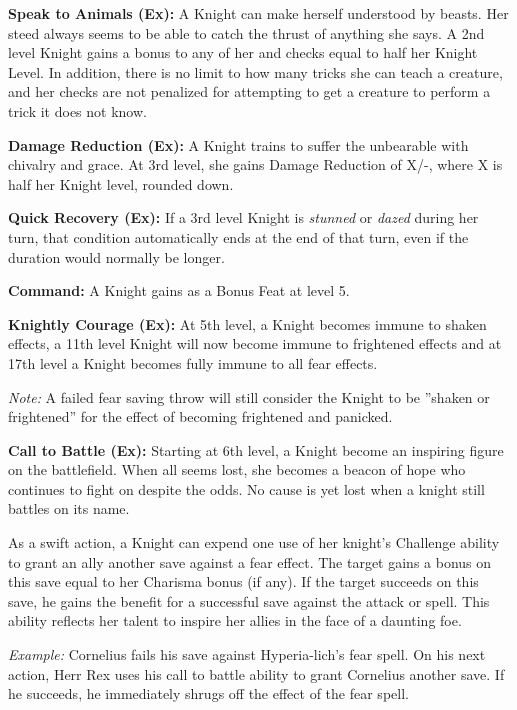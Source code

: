 \textbf{Speak to Animals (Ex):} A Knight can make herself understood by beasts. Her steed always seems to be able to catch the thrust of anything she says. A 2nd level Knight gains a bonus to any of her  and  checks equal to half her Knight Level. In addition, there is no limit to how many tricks she can teach a creature, and her  checks are not penalized for attempting to get a creature to perform a trick it does not know.

 \textbf{Damage Reduction (Ex):} A Knight trains to suffer the unbearable with chivalry and grace. At 3rd level, she gains Damage Reduction of X/-, where X is half her Knight level, rounded down.

\textbf{Quick Recovery (Ex):} If a 3rd level Knight is \textit{stunned} or \textit{dazed} during her turn, that condition automatically ends at the end of that turn, even if the duration would normally be longer.

\textbf{Command:} A Knight gains  as a Bonus Feat at level 5.

\textbf{Knightly Courage (Ex):} At 5th level, a Knight becomes immune to shaken effects, a 11th level Knight will now become immune to frightened effects and at 17th level a Knight becomes fully immune to all fear effects.

\textit{Note:} A failed fear saving throw will still consider the Knight to be ''shaken or frightened'' for the effect of becoming frightened and panicked.

\textbf{Call to Battle (Ex):} Starting at 6th level, a Knight become an inspiring figure on the battlefield. When all seems lost, she becomes a beacon of hope who continues to fight on despite the odds. No cause is yet lost when a knight still battles on its name.

As a swift action, a Knight can expend one use of her knight's Challenge ability to grant an ally another save against a fear effect. The target gains a bonus on this save equal to her Charisma bonus (if any). If the target succeeds on this save, he gains the benefit for a successful save against the attack or spell. This ability reflects her talent to inspire her allies in the face of a daunting foe.

\textit{Example:} Cornelius fails his save against Hyperia-lich's fear spell. On his next action, Herr Rex uses his call to battle ability to grant Cornelius another save. If he succeeds, he immediately shrugs off the effect of the fear spell.

